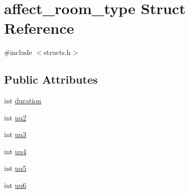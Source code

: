 \hypertarget{structaffect__room__type}{\section{affect\-\_\-room\-\_\-type Struct Reference}
\label{structaffect__room__type}
}


{\ttfamily \#include $<$structs.\-h$>$}

\subsection*{Public Attributes}
\begin{DoxyCompactItemize}
\item 
int \hyperlink{structaffect__room__type_a506d872bdd8c237caefa09fd9a1d2e45}{duration}
\item 
int \hyperlink{structaffect__room__type_aa433c4bcbe5cd22df04be1b4e4dd4cf1}{uu2}
\item 
int \hyperlink{structaffect__room__type_ab70101c6ccdf7b115eac8c785fe474cf}{uu3}
\item 
int \hyperlink{structaffect__room__type_a7fc591e6c4681f4457d36a73dde10ccb}{uu4}
\item 
int \hyperlink{structaffect__room__type_a49536cc84a081f408a3633bc723c74e1}{uu5}
\item 
int \hyperlink{structaffect__room__type_acefa436b006c8fdc887e4e5961b06f12}{uu6}
\end{DoxyCompactItemize}


